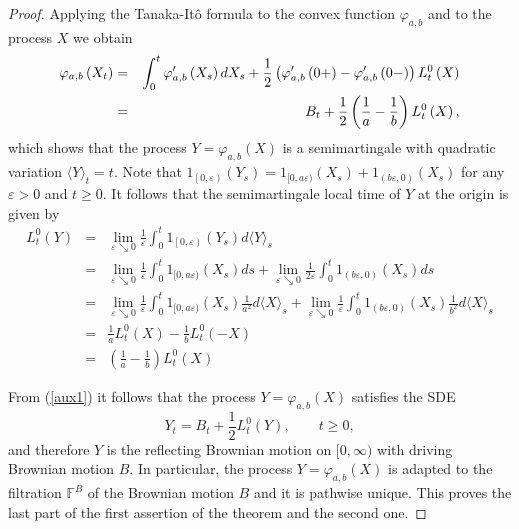 \documentclass[reqno]{amsart}
\theoremstyle{definition}
\theoremstyle{remark}
\numberwithin{equation}{section}
\begin{document}
\begin{proof}
Applying the Tanaka-It\^{o} formula to
the convex function $\varphi _{a,b}$ and to the process $X$ we obtain\begin{eqnarray}
\varphi _{a,b}\left( X_{t}\right) &=&\int_{0}^{t}\varphi _{a,b}^{{\prime
}}\left( X_{s}\right) dX_{s}+\frac{1}{2}\left( \varphi _{a,b}^{\prime
}\left( 0+\right) -\varphi _{a,b}^{\prime }\left( 0-\right) \right)
L_{t}^{0}\left( X\right) \label{aux1}\\
&=&B_{t}+\frac{1}{2}\left( \frac{1}{a}-\frac{1}{b}\right) L_{t}^{0}\left( X\right) ,  \notag
\end{eqnarray}which shows that the process $Y=\varphi _{a,b}\left( X\right) $ is a semimartingale with quadratic variation $\langle Y\rangle_t=t$. Note
that $1_{\left[0,\varepsilon \right) }\left( Y_{s}\right)
=1_{[0,a\varepsilon )}\left( X_{s}\right) +1_{(b\varepsilon ,0)}\left(
X_{s}\right) $ for any $\varepsilon >0$ and $t\geq 0$.  It follows that the semimartingale local time of $Y$ at the origin is given by
\begin{eqnarray*}
L_{t}^{0}\left( Y\right) &=&\lim_{\varepsilon \searrow 0}\frac{1}{\varepsilon }\int_{0}^{t}1_{\left[ 0 ,\varepsilon \right)
}\left( Y_{s}\right) d\langle Y\rangle _{s} \\
&=&\lim_{\varepsilon \searrow 0}\frac{1}{\varepsilon }\int_{0}^{t}1_{[0,a\varepsilon )}\left( X_{s}\right) ds+\lim_{\varepsilon \searrow 0}\frac{1}{2\varepsilon }\int_{0}^{t}1_{(b\varepsilon ,0)}\left( X_{s}\right) ds \\
&=&\lim_{\varepsilon \searrow 0}\frac{1}{\varepsilon }\int_{0}^{t}1_{[0,a\varepsilon )}\left( X_{s}\right) \frac{1}{a^{2}}d\langle X\rangle
_{s}+\lim_{\varepsilon \searrow 0}\frac{1}{\varepsilon }\int_{0}^{t}1_{(b\varepsilon ,0)}\left( X_{s}\right) \frac{1}{b^{2}}d\langle X\rangle _{s} \\
&=&\frac{1}{a}L_t^0(X)-\frac{1}{b} L_{t}^{0}\left( -X\right)\\
&=&\left( \frac{1}{a}-\frac{1}{b}\right) L_{t}^{0}\left( X\right)
\end{eqnarray*}

From (\ref{aux1}) it follows that the process $Y=\varphi _{a,b}\left(
X\right) $ satisfies the SDE\[
Y_{t}=B_{t}+\frac12L_{t}^{0}\left( Y\right) ,\qquad t\geq 0,
\]and therefore $Y$ is the reflecting Brownian motion on $[0,\infty )$ with driving Brownian motion $B$. In particular, the
process $Y=\varphi _{a,b}\left( X\right) $ is adapted to the filtration $\mathbb{F}^{B}$ of the Brownian motion $B$ and it is
pathwise unique. This proves the last part of the first assertion of the theorem and the second one.


\end{proof}
\end{document}
